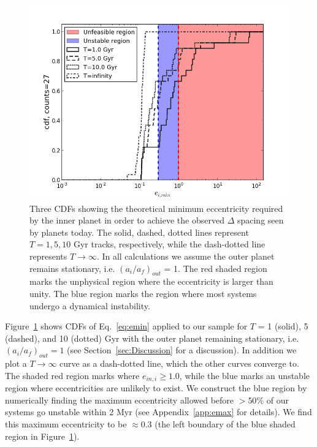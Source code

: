 \begin{figure}
\centerline{\includegraphics[trim=0cm 0cm 1cm 1cm, scale=0.48]{chap3/emin_Tconstraint.png}}
\caption{Three CDFs showing the theoretical minimum eccentricity required by the inner planet in order to achieve the observed $\Delta$ spacing seen by \kep{} planets today. The solid, dashed, dotted lines represent $T = 1, 5, 10$ Gyr tracks, respectively, while the dash-dotted line represents $T \rightarrow \infty$. In all calculations we assume the outer planet remains stationary, i.e. $(a_i /a_f)_{out}$ = 1. The red shaded region marks the unphysical region where the eccentricity is larger than unity. The blue region marks the region where most systems undergo a dynamical instability. }
\label{fig:emin}
\end{figure}

Figure~\ref{fig:emin} shows CDFs of Eq.~\ref{eq:emin} applied to our \kep{} sample for $T$ = 1 (solid), 5 (dashed), and 10 (dotted) Gyr with the outer planet remaining stationary, i.e. $(a_i /a_f)_{out} = 1$ (see Section~\ref{sec:Discussion} for a discussion).
In addition we plot a $T \rightarrow \infty$ curve as a dash-dotted line, which the other curves converge to.
The shaded red region marks where $e_{in,i} \geq 1.0$, while the blue marks an unstable region where eccentricities are unlikely to exist.
We construct the blue region by numerically finding the maximum eccentricity allowed before $> 50\%$ of our \kep{} systems go unstable within 2 Myr (see Appendix~\ref{app:emax} for details). 
We find this maximum eccentricity to be $\approx 0.3$ (the left boundary of the blue shaded region in Figure~\ref{fig:emin}).

